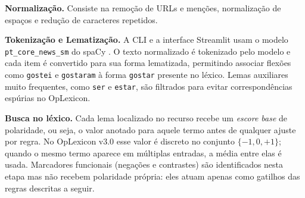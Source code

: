 \documentclass[11pt,a4paper]{article}
\newcommand{\new}[1]{\textcolor{newblue}{#1}}
\begin{document}
\textbf{Normalização.}
Consiste na remoção de URLs e menções, normalização de espaços e redução de caracteres repetidos.

\textbf{Tokenização e Lematização.}
A CLI e a interface Streamlit usam o modelo \texttt{pt\_core\_news\_sm} do spaCy \citep{spacyModels}. O texto normalizado é tokenizado pelo modelo e cada item é convertido para sua forma lematizada, permitindo associar flexões como \texttt{gostei} e \texttt{gostaram} à forma \texttt{gostar} presente no léxico. Lemas auxiliares muito frequentes, como \texttt{ser} e \texttt{estar}, são filtrados para evitar correspondências espúrias no OpLexicon.

\textbf{Busca no léxico.}
\new{Cada lema localizado no recurso recebe um \emph{escore base} de polaridade, ou seja, o valor anotado para aquele termo antes de qualquer ajuste por regra. No OpLexicon v3.0 esse valor é discreto no conjunto $\{-1, 0, +1\}$; quando o mesmo termo aparece em múltiplas entradas, a média entre elas é usada. Marcadores funcionais (negações e contrastes) são identificados nesta etapa mas não recebem polaridade própria: eles atuam apenas como gatilhos das regras descritas a seguir.}
\end{document}
